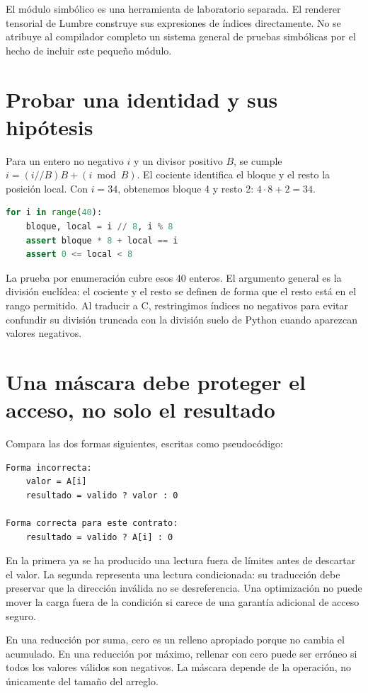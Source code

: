 \documentclass[12pt,a4paper,oneside]{report}
\begin{document}
El módulo simbólico es una herramienta de laboratorio separada. El renderer tensorial de Lumbre construye sus expresiones de índices directamente. No se atribuye al compilador completo un sistema general de pruebas simbólicas por el hecho de incluir este pequeño módulo.

\section{Probar una identidad y sus hipótesis}
Para un entero no negativo $i$ y un divisor positivo $B$, se cumple $i=(i//B)B+(i\bmod B)$. El cociente identifica el bloque y el resto la posición local. Con $i=34$, obtenemos bloque 4 y resto 2: $4\cdot8+2=34$.

\begin{lstlisting}[language=Python]
for i in range(40):
    bloque, local = i // 8, i % 8
    assert bloque * 8 + local == i
    assert 0 <= local < 8
\end{lstlisting}
La prueba por enumeración cubre esos 40 enteros. El argumento general es la división euclídea: el cociente y el resto se definen de forma que el resto está en el rango permitido. Al traducir a C, restringimos índices no negativos para evitar confundir su división truncada con la división suelo de Python cuando aparezcan valores negativos.

\section{Una máscara debe proteger el acceso, no solo el resultado}
Compara las dos formas siguientes, escritas como pseudocódigo:

\begin{lstlisting}
Forma incorrecta:
    valor = A[i]
    resultado = valido ? valor : 0

Forma correcta para este contrato:
    resultado = valido ? A[i] : 0
\end{lstlisting}
En la primera ya se ha producido una lectura fuera de límites antes de descartar el valor. La segunda representa una lectura condicionada: su traducción debe preservar que la dirección inválida no se desreferencia. Una optimización no puede mover la carga fuera de la condición si carece de una garantía adicional de acceso seguro.

En una reducción por suma, cero es un relleno apropiado porque no cambia el acumulado. En una reducción por máximo, rellenar con cero puede ser erróneo si todos los valores válidos son negativos. La máscara depende de la operación, no únicamente del tamaño del arreglo.
\end{document}
